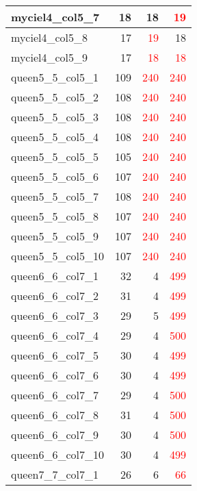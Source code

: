 \begin{longtable}{l|r|r|r}
  myciel4\_col5\_7 & 18 & 18 & \textcolor{red}{19} \\ \hline
  myciel4\_col5\_8 & 17 & \textcolor{red}{19} & 18 \\ \hline
  myciel4\_col5\_9 & 17 & \textcolor{red}{18} & \textcolor{red}{18} \\ \hline
  queen5\_5\_col5\_1 & 109 & \textcolor{red}{240} & \textcolor{red}{240} \\ \hline
  queen5\_5\_col5\_2 & 108 & \textcolor{red}{240} & \textcolor{red}{240} \\ \hline
  queen5\_5\_col5\_3 & 108 & \textcolor{red}{240} & \textcolor{red}{240} \\ \hline
  queen5\_5\_col5\_4 & 108 & \textcolor{red}{240} & \textcolor{red}{240} \\ \hline
  queen5\_5\_col5\_5 & 105 & \textcolor{red}{240} & \textcolor{red}{240} \\ \hline
  queen5\_5\_col5\_6 & 107 & \textcolor{red}{240} & \textcolor{red}{240} \\ \hline
  queen5\_5\_col5\_7 & 108 & \textcolor{red}{240} & \textcolor{red}{240} \\ \hline
  queen5\_5\_col5\_8 & 107 & \textcolor{red}{240} & \textcolor{red}{240} \\ \hline
  queen5\_5\_col5\_9 & 107 & \textcolor{red}{240} & \textcolor{red}{240} \\ \hline
  queen5\_5\_col5\_10 & 107 & \textcolor{red}{240} & \textcolor{red}{240} \\ \hline
  queen6\_6\_col7\_1 & 32 & 4 & \textcolor{red}{499} \\ \hline
  queen6\_6\_col7\_2 & 31 & 4 & \textcolor{red}{499} \\ \hline
  queen6\_6\_col7\_3 & 29 & 5 & \textcolor{red}{499} \\ \hline
  queen6\_6\_col7\_4 & 29 & 4 & \textcolor{red}{500} \\ \hline
  queen6\_6\_col7\_5 & 30 & 4 & \textcolor{red}{499} \\ \hline
  queen6\_6\_col7\_6 & 30 & 4 & \textcolor{red}{499} \\ \hline
  queen6\_6\_col7\_7 & 29 & 4 & \textcolor{red}{500} \\ \hline
  queen6\_6\_col7\_8 & 31 & 4 & \textcolor{red}{500} \\ \hline
  queen6\_6\_col7\_9 & 30 & 4 & \textcolor{red}{500} \\ \hline
  queen6\_6\_col7\_10 & 30 & 4 & \textcolor{red}{499} \\ \hline
  queen7\_7\_col7\_1 & 26 & 6 & \textcolor{red}{66} \\ \hline

\end{longtable}
